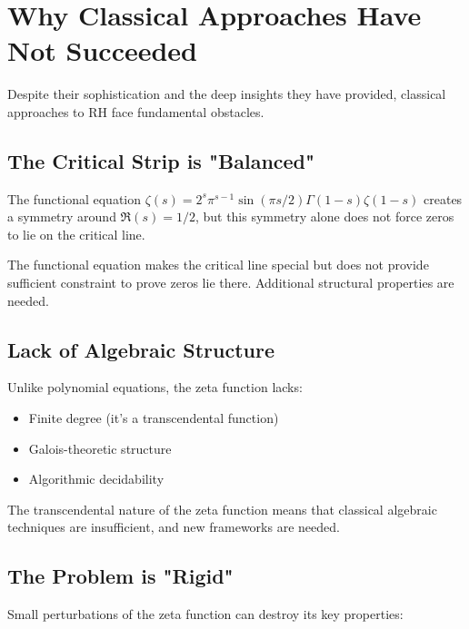 \section{Why Classical Approaches Have Not Succeeded}

Despite their sophistication and the deep insights they have provided, classical approaches to RH face fundamental obstacles.

\subsection{The Critical Strip is "Balanced"}

The functional equation $\zeta(s) = 2^s \pi^{s-1} \sin(\pi s/2) \Gamma(1-s) \zeta(1-s)$ creates a symmetry around $\Re(s) = 1/2$, but this symmetry alone does not force zeros to lie on the critical line.

\begin{remark}
The functional equation makes the critical line special but does not provide sufficient constraint to prove zeros lie there. Additional structural properties are needed.
\end{remark}

\subsection{Lack of Algebraic Structure}

Unlike polynomial equations, the zeta function lacks:
\begin{itemize}
\item Finite degree (it's a transcendental function)
\item Galois-theoretic structure
\item Algorithmic decidability
\end{itemize}

\begin{remark}
The transcendental nature of the zeta function means that classical algebraic techniques are insufficient, and new frameworks are needed.
\end{remark}

\subsection{The Problem is "Rigid"}

Small perturbations of the zeta function can destroy its key properties:

